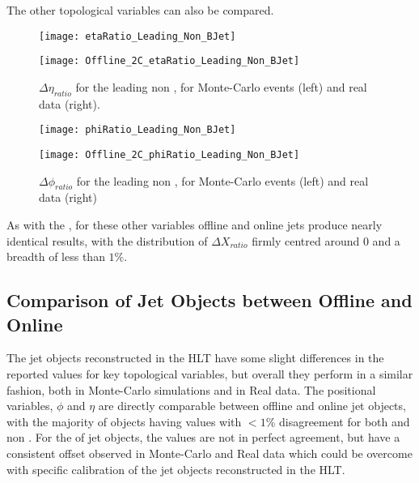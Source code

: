 	The other topological variables can also be compared.
	
	\begin{figure}[h]
		\centering
		\begin{minipage}[h]{0.33\linewidth}
			\texttt{[image: etaRatio\_Leading\_Non\_BJet]}
			
		\end{minipage}
		\quad
		\begin{minipage}[h]{0.33\linewidth}
			\texttt{[image: Offline\_2C\_etaRatio\_Leading\_Non\_BJet]}
		\end{minipage}
		\caption{$\Delta \eta_{ratio}$ for the leading non \bjet, for Monte-Carlo events (left) and real data (right).}
		\label{fig:O:leadingnonbeta}
	\end{figure}
	
	\begin{figure}[h]
		\centering
		\begin{minipage}[h]{0.33\linewidth}
			\texttt{[image: phiRatio\_Leading\_Non\_BJet]}
			
		\end{minipage}
		\quad
		\begin{minipage}[h]{0.33\linewidth}
			\texttt{[image: Offline\_2C\_phiRatio\_Leading\_Non\_BJet]}
		\end{minipage}
		\caption{$\Delta \phi_{ratio}$ for the leading non \bjet, for Monte-Carlo events (left) and real data (right)}
		\label{fig:O:leadingnonbphi}
	\end{figure}
	
	As with the \bjets, for these other variables offline and online jets produce nearly identical results, with the distribution of $\Delta X_{ratio}$ firmly centred around 0 and a breadth of less than $1\%$.
	
	\subsection{Comparison of Jet Objects between Offline and Online}
		
		The jet objects reconstructed in the HLT have some slight differences in the reported values for key topological variables, but overall they perform in a similar fashion, both in Monte-Carlo simulations and in Real data. The positional variables, $\phi$ and $\eta$ are directly comparable between offline and online jet objects, with the majority of objects having values with $<1\%$ disagreement for both \bjets and non \bjets. For the \pt of jet objects, the values are not in perfect agreement, but have a consistent offset observed in Monte-Carlo and Real data which could be overcome with specific calibration of the jet objects reconstructed in the HLT. 
	
